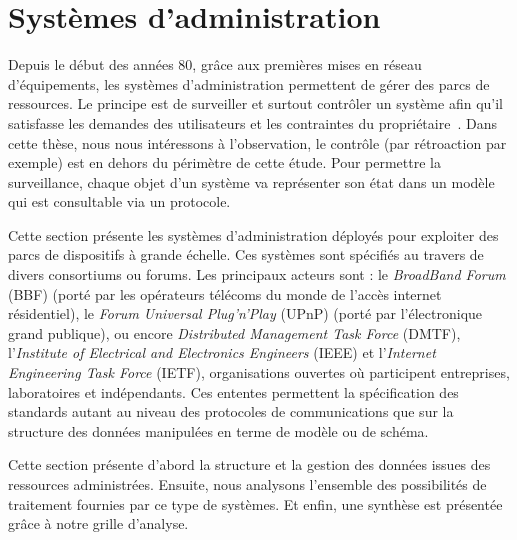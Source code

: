 \section{Systèmes d'administration}\label{sec:rw:supervision:administration}
Depuis le début des années 80, grâce aux premières mises en réseau d'équipements, les systèmes d'administration permettent de gérer des parcs de ressources. Le principe est de surveiller et surtout contrôler un système afin qu'il satisfasse les demandes des utilisateurs et les contraintes du propriétaire~\cite{Sloman:management}. Dans cette thèse, nous nous intéressons à l'observation, le contrôle (par rétroaction par exemple) est en dehors du périmètre de cette étude. Pour permettre la surveillance, chaque objet d'un système va représenter son état dans un modèle qui est consultable via un protocole.

Cette section présente les systèmes d'administration déployés pour exploiter des parcs de dispositifs à grande échelle. Ces systèmes sont spécifiés au travers de divers consortiums ou forums. Les principaux acteurs sont : le \textit{BroadBand Forum} (BBF) (porté par les opérateurs télécoms du monde de l'accès internet résidentiel), le \textit{Forum Universal Plug'n'Play} (UPnP) (porté par l'électronique grand publique), ou encore \textit{Distributed Management Task Force} (DMTF), l'\textit{Institute of Electrical and Electronics Engineers} (IEEE) et l'\textit{Internet Engineering Task Force} (IETF), organisations ouvertes où participent entreprises, laboratoires et indépendants. Ces ententes permettent la spécification des standards autant au niveau des protocoles de communications que sur la structure des données manipulées en terme de modèle ou de schéma.

Cette section présente d'abord la structure et la gestion des données issues des ressources administrées. Ensuite, nous analysons l'ensemble des possibilités de traitement fournies par ce type de systèmes. Et enfin, une synthèse est présentée grâce à notre grille d'analyse.
